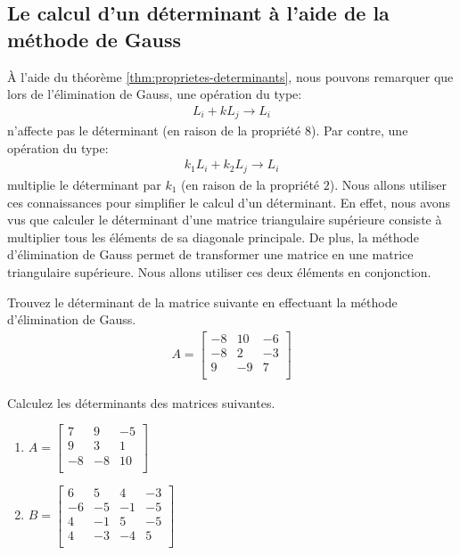 \documentclass[]{book}
\providecommand{\tightlist}{%
  \setlength{\itemsep}{0pt}\setlength{\parskip}{0pt}}
\theoremstyle{definition}
\theoremstyle{definition}
\theoremstyle{definition}
\theoremstyle{remark}
\let\BeginKnitrBlock\begin \let\EndKnitrBlock\end
\begin{document}
\hypertarget{le-calcul-dun-determinant-a-laide-de-la-methode-de-gauss}{%
\subsection{Le calcul d'un déterminant à l'aide de la méthode de Gauss}\label{le-calcul-dun-determinant-a-laide-de-la-methode-de-gauss}}

À l'aide du théorème \ref{thm:proprietes-determinants}, nous pouvons remarquer que lors de l'élimination de Gauss, une opération du type:
\begin{align*}
    L_i + kL_j \rightarrow L_i 
\end{align*}
n'affecte pas le déterminant (en raison de la propriété \(8\)). Par contre, une opération du type:
\begin{align*}
    k_1L_i + k_2L_j \rightarrow L_i 
\end{align*}
multiplie le déterminant par \(k_1\) (en raison de la propriété \(2\)). Nous allons utiliser ces connaissances pour simplifier le calcul d'un déterminant. En effet, nous avons vus que calculer le déterminant d'une matrice triangulaire supérieure consiste à multiplier tous les éléments de sa diagonale principale. De plus, la méthode d'élimination de Gauss permet de transformer une matrice en une matrice triangulaire supérieure. Nous allons utiliser ces deux éléments en conjonction.

\BeginKnitrBlock{example}
\protect\hypertarget{exm:unnamed-chunk-103}{}{\label{exm:unnamed-chunk-103} }Trouvez le déterminant de la matrice suivante en effectuant la méthode d'élimination de Gauss.
\begin{align*}
A=\begin{bmatrix}
-8&10&-6\\
-8&2&-3\\
9&-9&7\\
\end{bmatrix}
\end{align*}
\EndKnitrBlock{example}

\BeginKnitrBlock{example}
\protect\hypertarget{exm:unnamed-chunk-104}{}{\label{exm:unnamed-chunk-104} }Calculez les déterminants des matrices suivantes.

\begin{enumerate}
\def\labelenumi{\alph{enumi}.}
\tightlist
\item
  \(A=\begin{bmatrix} 7&9&-5\\ 9&3&1\\ -8&-8&10\\ \end{bmatrix}\)
\item
  \(B=\begin{bmatrix} 6&5&4&-3\\ -6&-5&-1&-5\\ 4&-1&5&-5\\ 4&-3&-4&5\\ \end{bmatrix}\)
\end{enumerate}
\EndKnitrBlock{example}
\end{document}
